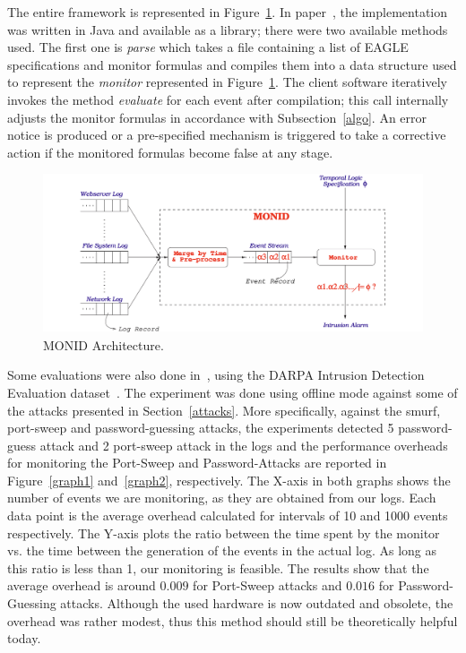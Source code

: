 \documentclass[english]{article}
\begin{document}
The entire framework is represented in Figure~\ref{monid}. In paper~\cite{naldurg2004temporal}, the implementation was written in Java and available as a library; there were two available methods used. The first one is \textit{parse} which takes a file containing a list of EAGLE specifications and monitor formulas and compiles them into a data structure used to represent the \textit{monitor} represented in Figure~\ref{monid}. The client software iteratively invokes the method \textit{evaluate} for each event after compilation; this call internally adjusts the monitor formulas in accordance with Subsection~\ref{algo}.
An error notice is produced or a pre-specified mechanism is triggered to take a corrective action if the monitored formulas become false at any stage.
\begin{figure}[]
	\centering
	\includegraphics[width=\textwidth]{images/monid.png}
	\caption{MONID Architecture.}
	\label{monid}
\end{figure}

Some evaluations were also done in~\cite{naldurg2004temporal}, using the DARPA Intrusion Detection Evaluation dataset~\cite{mchugh2000testing}. The experiment was done using offline mode against some of the attacks presented in Section~\ref{attacks}. More specifically, against the smurf, port-sweep and password-guessing attacks, the experiments detected 5 password-guess attack and 2 port-sweep attack in the logs and the performance overheads for monitoring the Port-Sweep and Password-Attacks are reported in Figure~\ref{graph1} and~\ref{graph2}, respectively. The X-axis in both graphs shows the number of events we are monitoring, as they are obtained from our logs. Each data point is the average overhead calculated for intervals of 10 and 1000 events respectively. The Y-axis plots the ratio between the time spent by the monitor vs. the time between the generation of the events in the actual log. As long as this ratio is less than 1, our monitoring is feasible. The results show that the average overhead is around $0.009$ for Port-Sweep attacks and $0.016$ for Password-Guessing attacks.
Although the used hardware is now outdated and obsolete, the overhead was rather modest, thus this method should still be theoretically helpful today.
\end{document}
